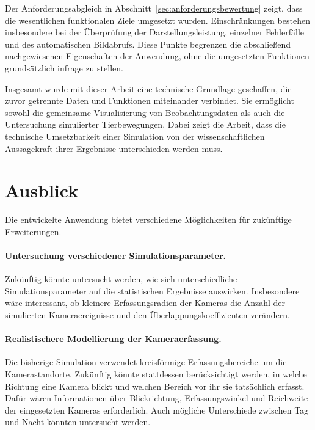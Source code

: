 \documentclass[12pt,a4paper]{report}
\begin{document}
Der Anforderungsabgleich in
Abschnitt~\ref{sec:anforderungsbewertung}
zeigt, dass die wesentlichen funktionalen
Ziele umgesetzt wurden. Einschränkungen
bestehen insbesondere bei der Überprüfung
der Darstellungsleistung, einzelner
Fehlerfälle und des automatischen
Bildabrufs. Diese Punkte begrenzen
die abschließend nachgewiesenen
Eigenschaften der Anwendung,
ohne die umgesetzten Funktionen
grundsätzlich infrage zu stellen.

Insgesamt wurde mit dieser Arbeit
eine technische Grundlage geschaffen,
die zuvor getrennte Daten und
Funktionen miteinander verbindet.
Sie ermöglicht sowohl die gemeinsame
Visualisierung von Beobachtungsdaten
als auch die Untersuchung simulierter
Tierbewegungen. Dabei zeigt die Arbeit,
dass die technische Umsetzbarkeit
einer Simulation von der
wissenschaftlichen Aussagekraft
ihrer Ergebnisse unterschieden
werden muss.






\section{Ausblick}

Die entwickelte Anwendung bietet verschiedene
Möglichkeiten für zukünftige Erweiterungen.

\paragraph{Untersuchung verschiedener Simulationsparameter.}
Zukünftig könnte untersucht werden, wie sich
unterschiedliche Simulationsparameter auf die
statistischen Ergebnisse auswirken. Insbesondere
wäre interessant, ob kleinere Erfassungsradien
der Kameras die Anzahl der simulierten
Kameraereignisse und den Überlappungskoeffizienten
verändern.

\paragraph{Realistischere Modellierung der Kameraerfassung.}
Die bisherige Simulation verwendet kreisförmige
Erfassungsbereiche um die Kamerastandorte.
Zukünftig könnte stattdessen berücksichtigt
werden, in welche Richtung eine Kamera blickt
und welchen Bereich vor ihr sie tatsächlich
erfasst. Dafür wären Informationen über
Blickrichtung, Erfassungswinkel und Reichweite
der eingesetzten Kameras erforderlich.
Auch mögliche Unterschiede zwischen Tag und
Nacht könnten untersucht werden.
\end{document}
